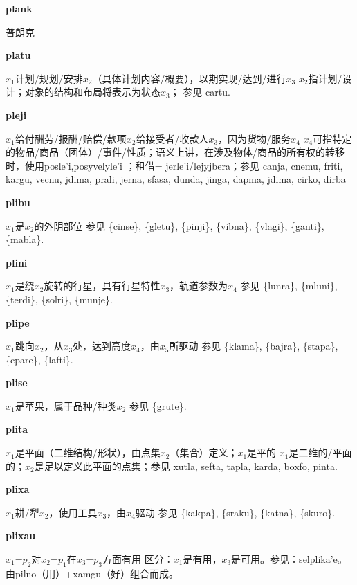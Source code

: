 \documentclass[notitlepage,twocolumn,a4paper,10pt]{book}
\begin{document}
{\sffamily\bfseries plank} 普朗克

{\sffamily\bfseries platu}\enspace {\ttfamily\bfseries[    pla]}  $x_1$计划\slash{}规划\slash{}安排$x_2$（具体计划内容\slash{}概要），以期实现\slash{}达到\slash{}进行$x_3$ \textemdash{} $x_2$指计划\slash{}设计；对象的结构和布局将表示为状态$x_3$； 参见 {cartu}.

{\sffamily\bfseries pleji}\enspace {\ttfamily\bfseries[lej     le'i]}  $x_1$给付酬劳\slash{}报酬\slash{}赔偿\slash{}款项$x_2$给接受者\slash{}收款人$x_3$，因为货物\slash{}服务$x_4$ \textemdash{} $x_4$可指特定的物品\slash{}商品（团体）\slash{}事件\slash{}性质；语义上讲，在涉及物体\slash{}商品的所有权的转移时，使用{posle'i},{posyvelyle'i} ；租借= {jerle'i}\slash{}{lejyjbera}；参见 {canja}, {cnemu}, {friti}, {kargu}, {vecnu}, {jdima}, {prali}, {jerna}, {sfasa}, {dunda}, {jinga}, {dapma}, {jdima}, {cirko}, {dirba}

{\sffamily\bfseries plibu}\enspace {\ttfamily\bfseries[pib]}  $x_1$是$x_2$的外阴部位 \textemdash{} 参见 \{cinse\}, \{gletu\}, \{pinji\}, \{vibna\}, \{vlagi\}, \{ganti\}, \{mabla\}.

{\sffamily\bfseries plini} $x_1$是绕$x_2$旋转的行星，具有行星特性$x_3$，轨道参数为$x_4$ \textemdash{} 参见 \{lunra\}, \{mluni\}, \{terdi\}, \{solri\}, \{munje\}.

{\sffamily\bfseries plipe}\enspace {\ttfamily\bfseries[pip     pi'e]}  $x_1$跳向$x_2$，从$x_3$处，达到高度$x_4$，由$x_5$所驱动 \textemdash{} 参见 \{klama\}, \{bajra\}, \{stapa\}, \{cpare\}, \{lafti\}.

{\sffamily\bfseries plise} $x_1$是苹果，属于品种\slash{}种类$x_2$ \textemdash{} 参见 \{grute\}.

{\sffamily\bfseries plita}\enspace {\ttfamily\bfseries[pit]}  $x_1$是平面（二维结构\slash{}形状），由点集$x_2$（集合）定义；$x_1$是平的 \textemdash{} $x_1$是二维的\slash{}平面的；$x_2$是足以定义此平面的点集；参见 {xutla}, {sefta}, {tapla}, {karda}, {boxfo}, {pinta}.

{\sffamily\bfseries plixa}\enspace {\ttfamily\bfseries[lix]}  $x_1$耕\slash{}犁$x_2$，使用工具$x_3$，由$x_4$驱动 \textemdash{} 参见 \{kakpa\}, \{sraku\}, \{katna\}, \{skuro\}.

{\sffamily\bfseries plixau} $x_1$=$p_2$对$x_2$=$p_1$在$x_3$=$p_3$方面有用 \textemdash{} 区分：$x_1$是有用，$x_3$是可用。参见：{selplika'e}。由{pilno}（用）+{xamgu}（好）组合而成。
\end{document}

